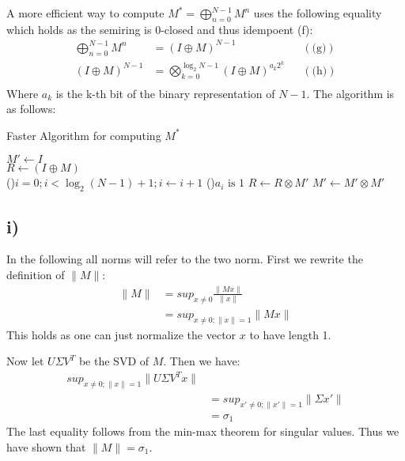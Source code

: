 \documentclass[a4paper,12pt]{ETHexercise}
\begin{document}
A more efficient way to compute $M^* = \bigoplus^{N-1}_{n=0} M^n$ uses the following equality which holds as the semiring is 0-closed and thus idempoent (f):
\begin{align}
    \bigoplus^{N-1}_{n=0} M^n &= (I \oplus M)^{N-1} &&(\text{(g)}) \\
    (I \oplus M)^{N-1} &= \bigotimes^{\log_2 N-1}_{k = 0} (I \oplus M)^{a_k 2^k} &&(\text{(h)}) \\
\end{align}
Where $a_k$ is the k-th bit of the binary representation of $N-1$.
The algorithm is as follows:
\begin{algorithm}
    \SetAlgoLined
    \caption[]{Faster Algorithm for computing $M^*$}
    $M' \gets I$\\
    $R  \gets (I \oplus M)$\\
    \For(){$i = 0; i < \log_2 (N-1)+1; i\gets i+1$}{
        \If(){$a_i \text{ is } 1$}{
            $R \gets R \otimes M'$
        }
        $M' \gets M' \otimes M'$
    }
\end{algorithm}

\subsection*{i)}
In the following all norms will refer to the two norm.
First we rewrite the definition of $\lVert M \rVert$:
\begin{align}
    \lVert M \rVert &= sup_{x \neq 0} \frac{\lVert Mx \rVert}{\lVert x \rVert} \\
    &= sup_{x \neq 0; \lVert x \rVert =1}\lVert Mx \rVert
\end{align}
This holds as one can just normalize the vector $x$ to have length 1. 

Now let $U \Sigma V^T$ be the SVD of $M$. Then we have:
\begin{align}
    sup_{x \neq 0; \lVert x \rVert =1} \lVert U \Sigma V^T x\rVert\\
    &= sup_{x' \neq 0; \lVert x' \rVert =1} \lVert \Sigma x'\rVert\\
    &= \sigma_1
\end{align}
The last equality follows from the min-max theorem for singular values. Thus we have shown that $\lVert M \rVert = \sigma_1$.
\end{document}
